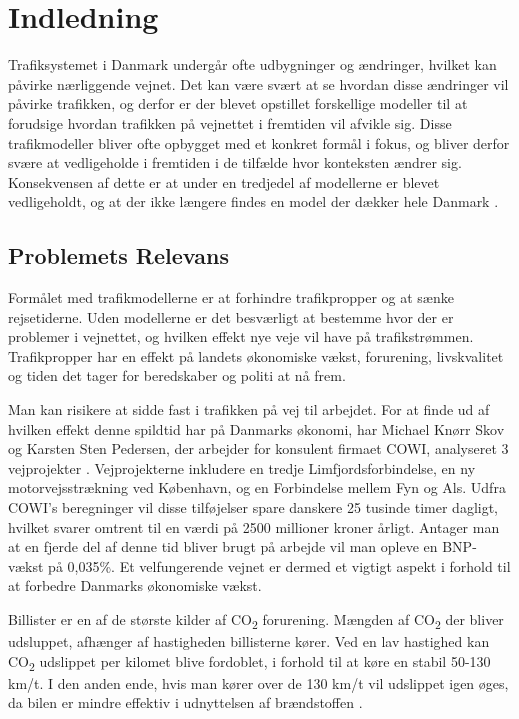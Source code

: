 \chapter{Indledning}\label{Indledning}
Trafiksystemet i Danmark undergår ofte udbygninger og ændringer, hvilket kan påvirke nærliggende vejnet. Det kan være svært at se hvordan disse ændringer vil påvirke trafikken, og derfor er der blevet opstillet forskellige modeller til at forudsige hvordan trafikken på vejnettet i fremtiden vil afvikle sig. Disse trafikmodeller bliver ofte opbygget med et konkret formål i fokus, og bliver derfor svære at vedligeholde i fremtiden i de tilfælde hvor konteksten ændrer sig. Konsekvensen af dette er at under en tredjedel af modellerne er blevet vedligeholdt, og at der ikke længere findes en model der dækker hele Danmark \cite[s. 1-2]{dtfnotat}.

\section{Problemets Relevans}
Formålet med trafikmodellerne er at forhindre trafikpropper og at sænke rejsetiderne. Uden modellerne er det besværligt at bestemme hvor der er problemer i vejnettet, og hvilken effekt nye veje vil have på trafikstrømmen. Trafikpropper har en effekt på landets økonomiske vækst, forurening, livskvalitet og tiden det tager for beredskaber og politi at nå frem.

\vspace{5mm}

Man kan risikere at sidde fast i trafikken på vej til arbejdet. For at finde ud af hvilken effekt denne spildtid har på Danmarks økonomi, har Michael Knørr Skov og Karsten Sten Pedersen, der arbejder for konsulent firmaet COWI, analyseret 3 vejprojekter \cite{trafikoekonomi}. Vejprojekterne inkludere en tredje Limfjordsforbindelse, en ny motorvejsstrækning ved København, og en Forbindelse mellem Fyn og Als. Udfra COWI’s beregninger vil disse tilføjelser spare danskere 25 tusinde timer dagligt, hvilket svarer omtrent til en værdi på 2500 millioner kroner årligt. Antager man at en fjerde del af denne tid bliver brugt på arbejde vil man opleve en BNP-vækst på 0,035\%. Et velfungerende vejnet er dermed et vigtigt aspekt i forhold til at forbedre Danmarks økonomiske vækst. 

\vspace{5mm}

Billister er en af de største kilder af CO\textsubscript{2} forurening. Mængden af CO\textsubscript{2} der bliver udsluppet, afhænger af hastigheden billisterne kører. Ved en lav hastighed kan CO\textsubscript{2} udslippet per kilomet blive fordoblet, i forhold til at køre en stabil 50-130 km/t. I den anden ende, hvis man kører over de 130 km/t vil udslippet igen øges, da bilen er mindre effektiv i udnyttelsen af brændstoffen \cite[s. 5-6]{forurening}.

